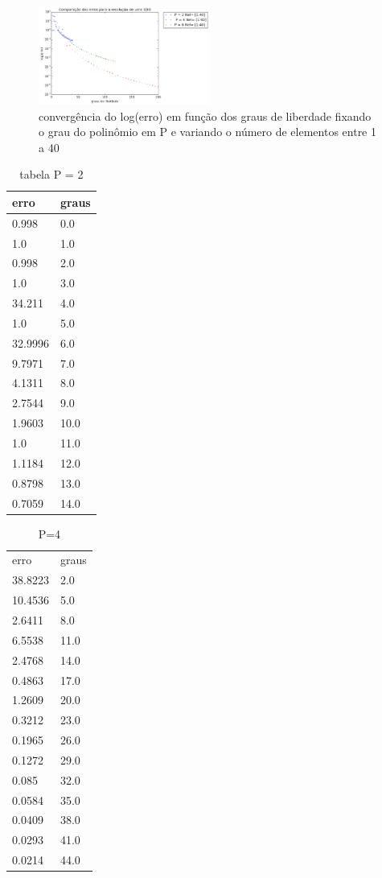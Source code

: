 \begin{figure}[!hb]
  \includegraphics[width=0.5\textwidth,center]{figuras/convergencia_erro_EDO.png}
  \caption{convergência do log(erro) em função dos graus de liberdade fixando o grau do polinômio em P e variando o número de elementos entre 1 a 40 }
\end{figure}

\begin{table}[]
\centering
\caption{tabela P = 2}
\label{my-label}
\begin{tabular}{|l|l|}
\hline
erro    & graus \\ \hline
0.998   & 0.0   \\ \hline
1.0     & 1.0   \\ \hline
0.998   & 2.0   \\ \hline
1.0     & 3.0   \\ \hline
34.211  & 4.0   \\ \hline
1.0     & 5.0   \\ \hline
32.9996 & 6.0   \\ \hline
9.7971  & 7.0   \\ \hline
4.1311  & 8.0   \\ \hline
2.7544  & 9.0   \\ \hline
1.9603  & 10.0  \\ \hline
1.0     & 11.0  \\ \hline
1.1184  & 12.0  \\ \hline
0.8798  & 13.0  \\ \hline
0.7059  & 14.0  \\ \hline
\end{tabular}
\end{table}

\begin{table}[]
\centering
\caption{P=4}
\label{my-label}
\begin{tabular}{ll}
erro    & graus \\
38.8223 & 2.0   \\
10.4536 & 5.0   \\
2.6411  & 8.0   \\
6.5538  & 11.0  \\
2.4768  & 14.0  \\
0.4863  & 17.0  \\
1.2609  & 20.0  \\
0.3212  & 23.0  \\
0.1965  & 26.0  \\
0.1272  & 29.0  \\
0.085   & 32.0  \\
0.0584  & 35.0  \\
0.0409  & 38.0  \\
0.0293  & 41.0  \\
0.0214  & 44.0 
\end{tabular}
\end{table}

